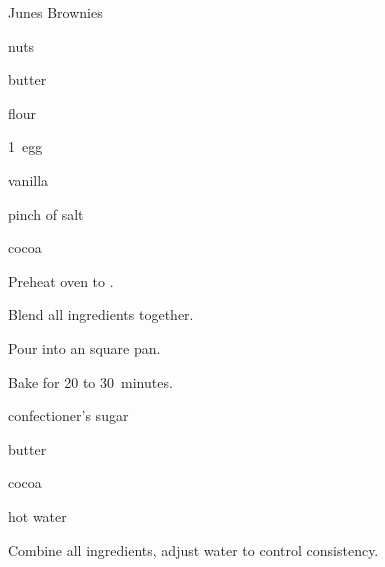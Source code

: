 \begin{recipe}{Junes Brownies}{}{}

\begin{ingredients}
\item \C{\half} nuts
\item \C{\half} butter
\item \C{\half} flour
\item 1~egg
\item {} vanilla
\item pinch of salt
\item {} cocoa
\end{ingredients}

\begin{directions}
\item Preheat oven to .
\item Blend all ingredients together.
\item Pour into an  square pan.
\item Bake for 20 to 30~minutes.
\end{directions}

\begin{ingredients}
\item {} confectioner's sugar
\item \C{\half} butter
\item {} cocoa
\item \C{\quarter} hot water
\end{ingredients}

\begin{directions}
\item Combine all ingredients, adjust water to control consistency.
\end{directions}

\end{recipe}

